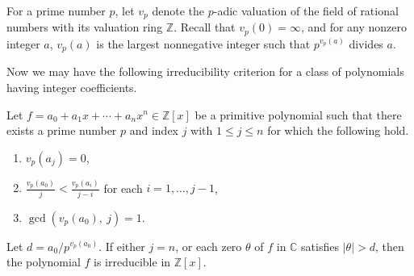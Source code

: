 \documentclass[12pt]{amsart}%
\begin{document}
For a prime number $p$, let $v_p$ denote the $p$-adic valuation of the field of rational numbers with its valuation ring  $\mathbb{Z}$. Recall that $v_p(0)=\infty$, and for any nonzero integer $a$, $v_p(a)$ is the largest nonnegative integer such that $p^{v_p(a)}$ divides $a$.

Now we may have the following irreducibility criterion for a class of polynomials having integer coefficients.
\begin{theorem}\label{th:2}
Let $f=a_0 + a_1x + \cdots + a_nx^n \in \mathbb{Z}[x]$ be a primitive polynomial such that there exists a prime number $p$ and index $j$ with $1\leq j\leq n$ for which the following hold.
\begin{enumerate}[label=$(\roman*)$]
\item $v_p(a_j)=0$,
\item $\frac{v_p(a_0)}{j}<\frac{v_p(a_i)}{j-i}$ for each $i=1,\ldots,j-1$,
\item $\gcd(v_p(a_0),~j) = 1$.
\end{enumerate}
Let $d=a_0/p^{v_p(a_0)}$. If either $j=n$, or each zero $\theta$ of $f$ in ${\mathbb{C}}$ satisfies $|\theta|>d$, then  the polynomial $f$ is irreducible in $\mathbb{Z}[x]$.
\end{theorem}
\end{document}
